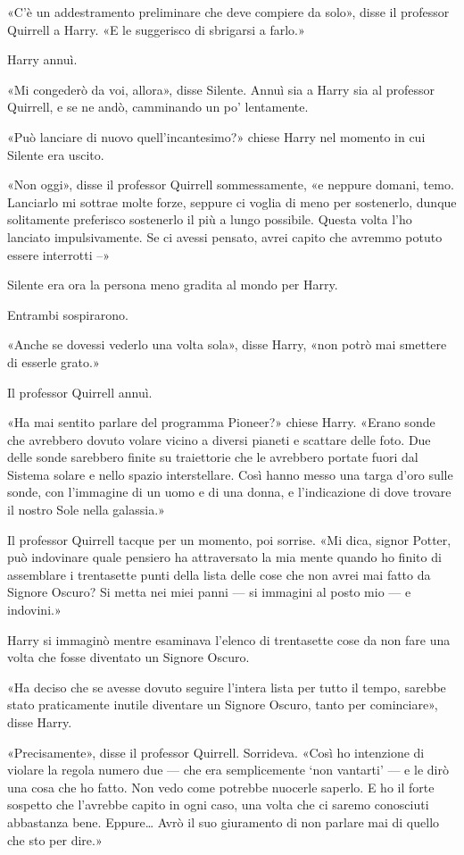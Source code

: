 «C’è un addestramento preliminare che deve compiere da solo», disse il professor Quirrell a Harry. «E le suggerisco di sbrigarsi a farlo.»

Harry annuì.

«Mi congederò da voi, allora», disse Silente. Annuì sia a Harry sia al professor Quirrell, e se ne andò, camminando un po’ lentamente.

«Può lanciare di nuovo quell’incantesimo?» chiese Harry nel momento in cui Silente era uscito.

«Non oggi», disse il professor Quirrell sommessamente, «e neppure domani, temo. Lanciarlo mi sottrae molte forze, seppure ci voglia di meno per sostenerlo, dunque solitamente preferisco sostenerlo il più a lungo possibile. Questa volta l’ho lanciato impulsivamente. Se ci avessi pensato, avrei capito che avremmo potuto essere interrotti –»

Silente era ora la persona meno gradita al mondo per Harry.

Entrambi sospirarono.

«Anche se dovessi vederlo una volta sola», disse Harry, «non potrò mai smettere di esserle grato.»

Il professor Quirrell annuì.

«Ha mai sentito parlare del programma Pioneer?» chiese Harry. «Erano sonde che avrebbero dovuto volare vicino a diversi pianeti e scattare delle foto. Due delle sonde sarebbero finite su traiettorie che le avrebbero portate fuori dal Sistema solare e nello spazio interstellare. Così hanno messo una targa d’oro sulle sonde, con l’immagine di un uomo e di una donna, e l’indicazione di dove trovare il nostro Sole nella galassia.»

Il professor Quirrell tacque per un momento, poi sorrise. «Mi dica, signor Potter, può indovinare quale pensiero ha attraversato la mia mente quando ho finito di assemblare i trentasette punti della lista delle cose che non avrei mai fatto da Signore Oscuro? Si metta nei miei panni — si immagini al posto mio — e indovini.»

Harry si immaginò mentre esaminava l’elenco di trentasette cose da non fare una volta che fosse diventato un Signore Oscuro.

«Ha deciso che se avesse dovuto seguire l’intera lista per tutto il tempo, sarebbe stato praticamente inutile diventare un Signore Oscuro, tanto per cominciare», disse Harry.

«Precisamente», disse il professor Quirrell. Sorrideva. «Così ho intenzione di violare la regola numero due — che era semplicemente ‘non vantarti’ — e le dirò una cosa che ho fatto. Non vedo come potrebbe nuocerle saperlo. E ho il forte sospetto che l’avrebbe capito in ogni caso, una volta che ci saremo conosciuti abbastanza bene. Eppure… Avrò il suo giuramento di non parlare mai di quello che sto per dire.»

